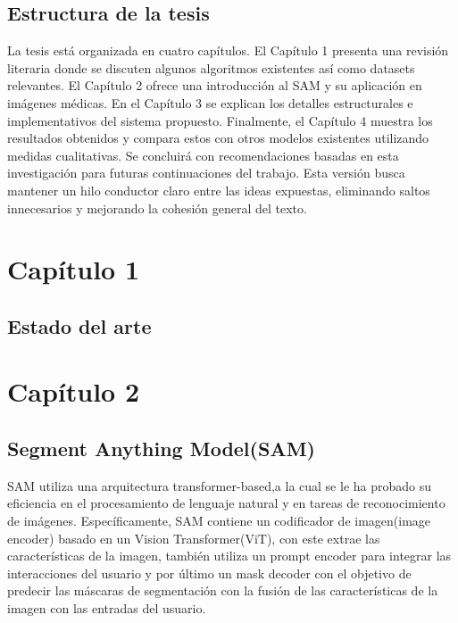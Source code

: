 \documentclass[12pt]{article}
\begin{document}
	\subsection{Estructura de la tesis}
	La tesis está organizada en cuatro capítulos. El Capítulo 1 presenta una revisión literaria donde se discuten algunos algoritmos existentes así como datasets relevantes. El Capítulo 2 ofrece una introducción al SAM y su aplicación en imágenes médicas. En el Capítulo 3 se explican los detalles estructurales e implementativos del sistema propuesto. Finalmente, el Capítulo 4 muestra los resultados obtenidos y compara estos con otros modelos existentes utilizando medidas cualitativas. Se concluirá con recomendaciones basadas en esta investigación para futuras continuaciones del trabajo. Esta versión busca mantener un hilo conductor claro entre las ideas expuestas, eliminando saltos innecesarios y mejorando la cohesión general del texto.

	
	
	
	\newpage
	
	\section{Cap\'itulo 1}
		\subsection{Estado del arte}
	
	
	\newpage
	
	\section{Cap\'itulo 2}
		\subsection{Segment Anything Model(SAM)}
		SAM utiliza una arquitectura transformer-based,a la cual se le ha probado su eficiencia en el procesamiento de lenguaje natural y en tareas de reconocimiento de im\'agenes. Espec\'ificamente, SAM contiene un codificador de imagen(image encoder) basado en un Vision Transformer(ViT), con este extrae las caracter\'isticas de la imagen, tambi\'en utiliza un prompt encoder para integrar las interacciones del usuario y por \'ultimo un mask decoder con el objetivo de predecir las m\'ascaras de segmentaci\'on con la fusi\'on de las caracter\'isticas de la imagen con las entradas del usuario.
		\\
		
\end{document}
